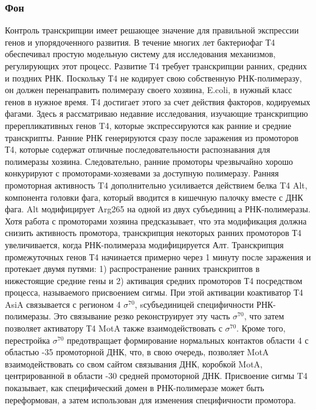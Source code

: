 \documentclass[a4paper,12pt]{article}
\begin{document}
    \subsubsection{Фон}
        \par{Контроль транскрипции имеет решающее значение для правильной экспрессии генов и упорядоченного развития. В течение
        многих лет бактериофаг Т4 обеспечивал простую модельную систему для исследования механизмов, регулирующих этот
        процесс. Развитие Т4 требует транскрипции ранних, средних и поздних РНК. Поскольку Т4 не кодирует свою собственную
        РНК-полимеразу, он должен перенаправить полимеразу своего хозяина, E.coli, в нужный класс генов в нужное время. Т4
        достигает этого за счет действия факторов, кодируемых фагами. Здесь я рассматриваю недавние исследования, изучающие
        транскрипцию пререпликативных генов T4, которые экспрессируются как ранние и средние транскрипты. Ранние РНК
        генерируются сразу после заражения из промоторов Т4, которые содержат отличные последовательности распознавания для
        полимеразы хозяина. Следовательно, ранние промоторы чрезвычайно хорошо конкурируют с промоторами-хозяевами за
        доступную полимеразу. Ранняя промоторная активность T4 дополнительно усиливается действием белка T4 Alt, компонента
        головки фага, который вводится в кишечную палочку вместе с ДНК фага. Alt модифицирует Arg265 на одной из двух
        субъединиц а РНК-полимеразы. Хотя работа с промоторами хозяина предсказывает, что эта модификация должна снизить
        активность промотора, транскрипция некоторых ранних промоторов Т4 увеличивается, когда РНК-полимераза модифицируется
        Алт. Транскрипция промежуточных генов Т4 начинается примерно через 1 минуту после заражения и протекает двумя путями:
        1) распространение ранних транскриптов в нижестоящие средние гены и 2) активация средних промоторов Т4 посредством
        процесса, называемого присвоением сигмы. При этой активации коактиватор Т4 AsiA связывается с регионом 4
        \(\sigma^{70}\), sсубъединицей специфичности РНК-полимеразы. Это связывание резко реконструирует эту часть
        \(\sigma^{70}\), что затем позволяет активатору Т4 MotA также взаимодействовать с \(\sigma^{70}\). Кроме того,
        перестройка \(\sigma^{70}\) предотвращает формирование нормальных контактов области 4 с областью -35 промоторной ДНК,
        что, в свою очередь, позволяет MotA взаимодействовать со свом сайтом связывания ДНК, коробкой MotA, центрированной в
        области -30 средней промоторной ДНК. Присвоение сигмы T4 показывает, как специфический домен в РНК-полимеразе может
        быть переформован, а затем использован для изменения специфичности промотора. \cite{hinton}}
\end{document}
